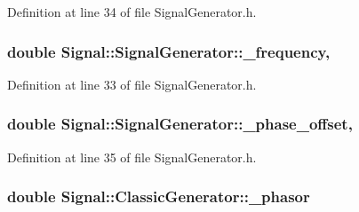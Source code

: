 Definition at line 34 of file Signal\+Generator.\+h.

\hypertarget{classSignal_1_1SignalGenerator_a7f107461333bce68c5dad412db96a8c2}{
\subsubsection[{\+\_\+frequency}]{\setlength{\rightskip}{0pt plus 5cm}double Signal\+::\+Signal\+Generator\+::\+\_\+frequency\hspace{0.3cm}{\ttfamily [protected]}, {\ttfamily [inherited]}}}\label{classSignal_1_1SignalGenerator_a7f107461333bce68c5dad412db96a8c2}


Definition at line 33 of file Signal\+Generator.\+h.

\hypertarget{classSignal_1_1SignalGenerator_a6b4444d46747c8517171edbbf4b5588f}{
\subsubsection[{\+\_\+phase\+\_\+offset}]{\setlength{\rightskip}{0pt plus 5cm}double Signal\+::\+Signal\+Generator\+::\+\_\+phase\+\_\+offset\hspace{0.3cm}{\ttfamily [protected]}, {\ttfamily [inherited]}}}\label{classSignal_1_1SignalGenerator_a6b4444d46747c8517171edbbf4b5588f}


Definition at line 35 of file Signal\+Generator.\+h.

\hypertarget{classSignal_1_1ClassicGenerator_ade9b66bc49d2d2f40a1390fc6374b8b2}{
\subsubsection[{\+\_\+phasor}]{\setlength{\rightskip}{0pt plus 5cm}double Signal\+::\+Classic\+Generator\+::\+\_\+phasor\hspace{0.3cm}{\ttfamily [protected]}}}\label{classSignal_1_1ClassicGenerator_ade9b66bc49d2d2f40a1390fc6374b8b2}


